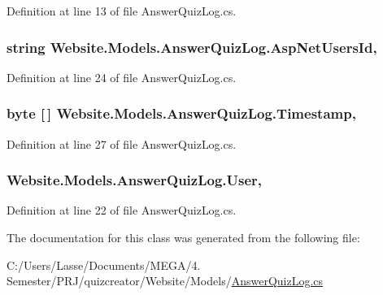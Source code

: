 Definition at line 13 of file Answer\+Quiz\+Log.\+cs.

\hypertarget{class_website_1_1_models_1_1_answer_quiz_log_ad693cfd30714a20ade4f1156b501e2c0}{}
\subsubsection[{Asp\+Net\+Users\+Id}]{\setlength{\rightskip}{0pt plus 5cm}string Website.\+Models.\+Answer\+Quiz\+Log.\+Asp\+Net\+Users\+Id\hspace{0.3cm}{\ttfamily [get]}, {\ttfamily [set]}}\label{class_website_1_1_models_1_1_answer_quiz_log_ad693cfd30714a20ade4f1156b501e2c0}


Definition at line 24 of file Answer\+Quiz\+Log.\+cs.

\hypertarget{class_website_1_1_models_1_1_answer_quiz_log_a5a7b5ad12a824501c39793e9fcc00c01}{}
\subsubsection[{Timestamp}]{\setlength{\rightskip}{0pt plus 5cm}byte \mbox{[}$\,$\mbox{]} Website.\+Models.\+Answer\+Quiz\+Log.\+Timestamp\hspace{0.3cm}{\ttfamily [get]}, {\ttfamily [set]}}\label{class_website_1_1_models_1_1_answer_quiz_log_a5a7b5ad12a824501c39793e9fcc00c01}


Definition at line 27 of file Answer\+Quiz\+Log.\+cs.

\hypertarget{class_website_1_1_models_1_1_answer_quiz_log_aebef58b18794b0ea88e5c4a9c2449621}{}
\subsubsection[{User}]{ Website.\+Models.\+Answer\+Quiz\+Log.\+User\hspace{0.3cm}{\ttfamily [get]}, {\ttfamily [set]}}\label{class_website_1_1_models_1_1_answer_quiz_log_aebef58b18794b0ea88e5c4a9c2449621}


Definition at line 22 of file Answer\+Quiz\+Log.\+cs.



The documentation for this class was generated from the following file\+:\begin{DoxyCompactItemize}
\item 
C\+:/\+Users/\+Lasse/\+Documents/\+M\+E\+G\+A/4. Semester/\+P\+R\+J/quizcreator/\+Website/\+Models/\hyperlink{_answer_quiz_log_8cs}{Answer\+Quiz\+Log.\+cs}\end{DoxyCompactItemize}
